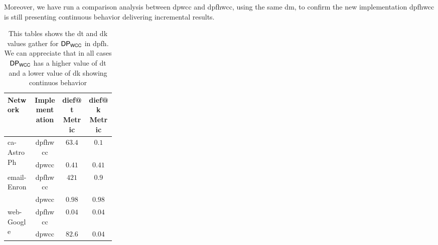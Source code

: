 Moreover, we have run a comparison analysis between \acrshort{dpwcc} and \acrshort{dpfhwcc}, using the same \acrlong{dm}, to confirm the new implementation \acrshort{dpfhwcc} is still presenting continuous behavior delivering incremental results.

\begin{table}[htp!]
  \centering
  \begin{tabular}{|p{0.25\linewidth}|c|c|c|}
    \hline
   \textbf{Network} & \textbf{Implementation} & \textbf{dief@t Metric}  & \textbf{dief@k Metric}\\
   \hline
   \multirow{2}{*}{ca-AstroPh} & \acrshort{dpfhwcc} & $63.4$ & $0.1$\\
   & \acrshort{dpwcc} & $0.41$ & $0.41$\\
   \hline
   \multirow{2}{*}{email-Enron} & \acrshort{dpfhwcc} & $421$ & $0.9$\\
   & \acrshort{dpwcc} & $0.98$ & $0.98$\\
   \hline
   \multirow{2}{*}{web-Google} & \acrshort{dpfhwcc} & $0.04$ & $0.04$ \\
   & \acrshort{dpwcc} & $82.6$ & $0.04$\\
  \hline
  \end{tabular}
  \caption{This tables shows the \acrshort{dt} and \acrshort{dk} values gather for  $\mathsf{DP_{WCC}}$ in \acrshort{dpfh}. We can appreciate that in all cases $\mathsf{DP_{WCC}}$ has a higher value of \acrshort{dt} and a lower value of \acrshort{dk} showing continuos behavior}
 \label{table:e1:dm:values}
 \end{table}

